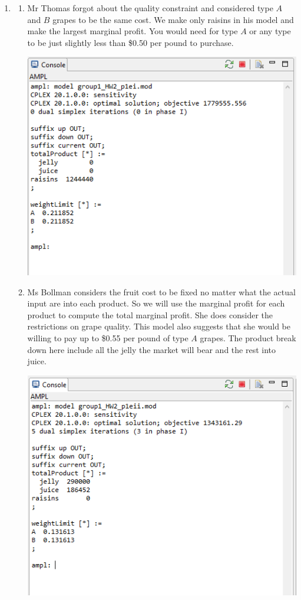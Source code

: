 \documentclass[11pt]{article}
\begin{document}
\begin{enumerate}
\begin{enumerate}
\item 
\begin{enumerate}
\item Mr Thomas forgot about the quality constraint and considered type $A$ and $B$ grapes to be the same cost.  We make only raisins in his model and make the largest marginal profit.  You would need for type $A$ or any type to be just slightly less than \$0.50 per pound to purchase.

\includegraphics[width=.9\textwidth]{output1ei.png}

\item Ms Bollman considers the fruit cost to be fixed no matter what the actual input are into each product.  So we will use the marginal profit for each product to compute the total marginal profit.  She does consider the restrictions on grape quality.  This model also suggests that she would be willing to pay up to \$0.55 per pound of type $A$ grapes.  The product break down here include all the jelly the market will bear and the rest into juice.

\includegraphics[width=.9\textwidth]{output1eii.png}


\end{enumerate}
\end{enumerate}
\end{enumerate}
\end{document}
